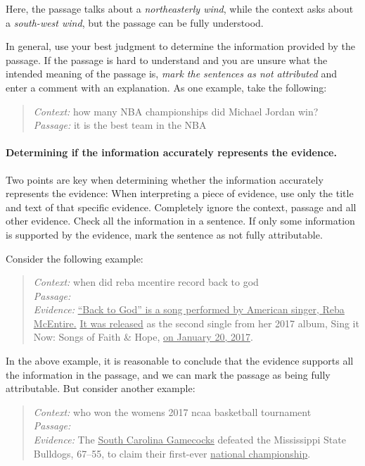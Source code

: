 \documentclass[11pt]{article}
\begin{document}
Here, the passage talks about a \textit{northeasterly wind}, while the context asks about a \textit{south-west wind}, but the passage can be fully understood.

In general, use your best judgment to determine the information provided by the passage. If the passage is hard to understand and you are unsure what the intended meaning of the passage is, \textit{mark the sentences as not attributed} and enter a comment with an explanation. As one example, take the following:

\begin{quote}
\textit{Context:} how many NBA championships did Michael Jordan win? \\
\textit{Passage:} it is the best team in the NBA
\end{quote}

\paragraph{Determining if the information accurately represents the evidence.}
Two points are key when determining whether the information accurately represents the evidence:
When interpreting a piece of evidence, use only the title and text of that specific evidence. Completely ignore the context, passage and all other evidence.
Check all the information in a sentence. If only some information is supported by the evidence, mark the sentence as not fully attributable.

Consider the following example:
\begin{quote}
\textit{Context:}
when did reba mcentire record back to god \\
\textit{Passage:}
 \\
\textit{Evidence:}
\ul{``Back to God'' is a song performed by American singer, Reba McEntire.} \ul{It was released} as the second single from her 2017 album, Sing it Now: Songs of Faith \& Hope, \ul{on January 20, 2017}.
\end{quote}
In the above example, it is reasonable to conclude that the evidence supports all the information in the passage, and we can mark the passage as being fully attributable. But consider another example:

\begin{quote}
\textit{Context:}
who won the womens 2017 ncaa basketball tournament \\
\textit{Passage:}
 \\
\textit{Evidence:}
The \ul{South Carolina Gamecocks} defeated the Mississippi State Bulldogs, 67–55, to claim their first-ever \ul{national championship}.
\end{quote}
\end{document}
